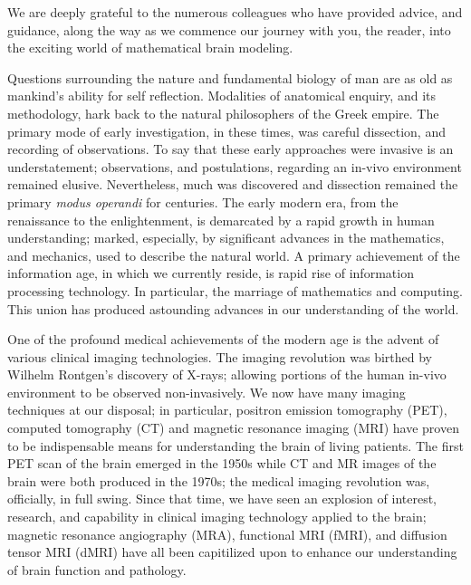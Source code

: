 We are deeply grateful to
the numerous colleagues who have provided advice, and guidance, along the
way as we commence our journey with you, the reader, into the exciting world
of mathematical brain modeling.




Questions surrounding the nature and fundamental biology of man are as old as 
mankind's ability for self reflection.  Modalities of anatomical  
enquiry, and its methodology, hark back to the natural philosophers of 
the Greek empire.  The primary mode of early investigation, in these times, 
was careful dissection, and recording of observations.  To say that these early 
approaches were invasive is an understatement; observations, and postulations, 
regarding an in-vivo environment remained elusive.  Nevertheless, much was 
discovered and dissection remained the primary \textit{modus operandi} for 
centuries.  The early modern era, from the renaissance to the enlightenment, 
is demarcated by a rapid growth in human understanding; marked, especially, by 
significant advances in the mathematics, and mechanics, used to describe the natural 
world.  A primary achievement of the information age, in which we currently 
reside, is rapid rise of information processing technology.  In particular, 
the marriage of mathematics and computing.  This union has produced astounding 
advances in our understanding of the world. 

One of the profound medical achievements of the modern age is the advent of 
various clinical imaging technologies.  The imaging revolution was birthed by 
Wilhelm Rontgen's discovery of X-rays; allowing portions of the human in-vivo 
environment to be observed non-invasively.  We now have many imaging techniques 
at our disposal; in particular, positron emission tomography (PET), computed 
tomography (CT) and  magnetic resonance imaging (MRI) have proven to be indispensable 
means for understanding the brain of living patients.  The first PET scan of 
the brain emerged in the 1950s while CT and MR images of the brain were both 
produced in the 1970s; the medical imaging revolution was, officially, in full 
swing.  Since that time, we have seen an explosion of interest, research, and 
capability in clinical imaging technology applied to the brain; magnetic resonance 
angiography (MRA), functional MRI (fMRI), and diffusion tensor MRI (dMRI) have 
all been capitilized upon to enhance our understanding of brain function and 
pathology.  

